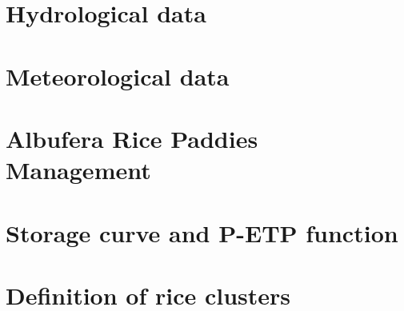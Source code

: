 \documentclass[
  letterpaper,
  DIV=11,
  numbers=noendperiod]{scrreprt}
\begin{document}
\section{Hydrological data}\label{sec-data-hydro}

\section{Meteorological data}\label{sec-data-meteo}

\section{Albufera Rice Paddies
Management}\label{sec-data-albufera-management}

\section{Storage curve and P-ETP function}\label{sec-storage-curve}

\section{Definition of rice clusters}\label{sec-data-rice-clusters}
\end{document}

